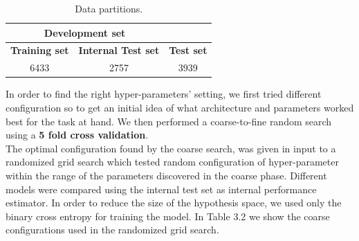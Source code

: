 \begin{table}[!htb]
\centering
\begin{tabular}{ccc}
\hline
\multicolumn{2}{c}{\textbf{Development set}}       & \textbf{}         \\ \hline
\textbf{Training set} & \textbf{Internal Test set} & \textbf{Test set} \\
6433                  & 2757                       &     3939              \\ \hline
\end{tabular}
\caption{Data partitions.}
\label{Data partitions}
\end{table}
In order to find the right hyper-parameters' setting, we first tried different configuration so to get an initial idea of what architecture and parameters worked best for the task at hand. We then performed a coarse-to-fine random search using a \textbf{5 fold cross validation}.\\ 
The optimal configuration found by the coarse search, was given in input to a randomized grid search which tested random configuration of hyper-parameter within the range of the parameters discovered in the coarse phase. Different models were compared using the internal test set as internal performance estimator. In order to reduce the size of the hypothesis space, we used only the binary cross entropy for training the model. In Table 3.2 we show the coarse configurations used in the randomized grid search. 


